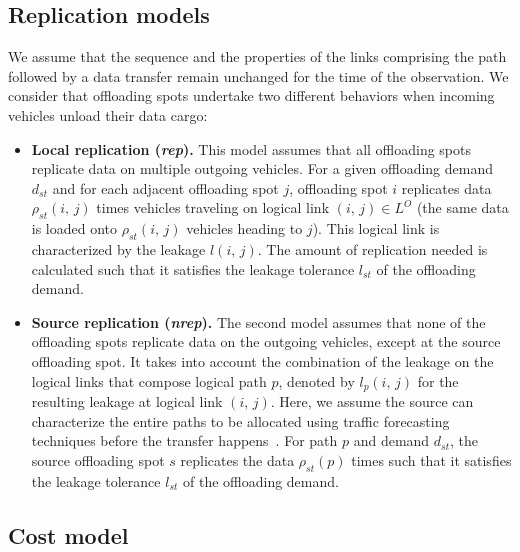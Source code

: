 \subsection{Replication models}
\label{sec:replication-models}

We assume that the sequence and the properties of the links comprising the path followed by a data transfer remain unchanged for the time of the observation. We consider that offloading spots undertake two different behaviors when incoming vehicles unload their data cargo:

\begin{itemize}

	\item \textbf{Local replication (\textit{rep}).} This model assumes that all offloading spots replicate data on multiple outgoing vehicles. For a given offloading demand $d_{st}$ and for each adjacent offloading spot $j$, offloading spot $i$ replicates data $\rho_{st}(i,\,j)$ times vehicles traveling on logical link $(i,\,j)\in L^{O}$ (\ie the same data is loaded onto $\rho_{st}(i,\,j)$ vehicles heading to $j$). This logical link is characterized by the leakage $l(i,\,j)$. The amount of replication needed is calculated such that it satisfies the leakage tolerance $l_{st}$ of the offloading demand. 

	\item \textbf{Source replication (\textit{nrep}).} The second model assumes that none of the offloading spots replicate data on the outgoing vehicles, except at the source offloading spot. It takes into account the combination of the leakage on the logical links that compose logical path $p$, denoted by $l_{p}(i,\,j)$ for the resulting leakage at logical link $(i,\,j)$. Here, we assume the source can characterize the entire paths to be allocated using traffic forecasting techniques before the transfer happens~\cite{de2011modelling,sheffi1985urban}. For path $p$ and demand $d_{st}$, the source offloading spot $s$ replicates the data $\rho_{st}(p)$ times such that it satisfies the leakage tolerance $l_{st}$ of the offloading demand. 

\end{itemize}

\subsection{Cost model} 

